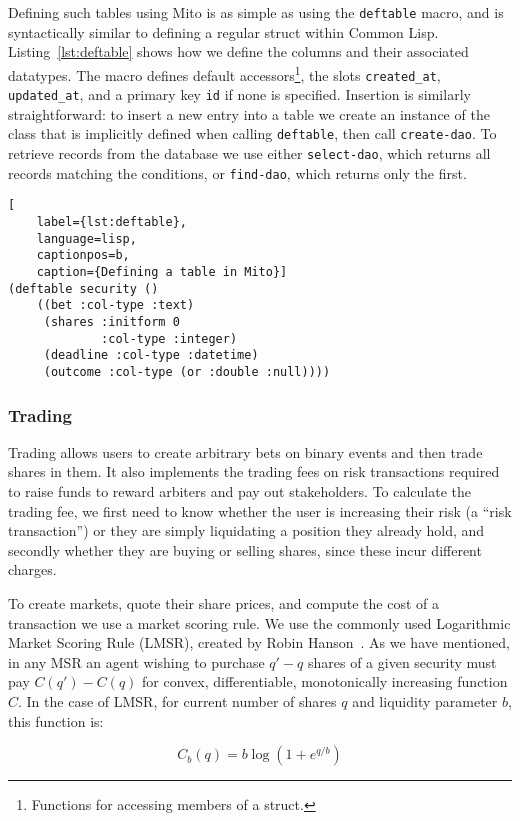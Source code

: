 \documentclass[10pt,a4paper]{article}
\theoremstyle{plain}
\theoremstyle{definition}
\newcommand{\code}[1]{\texttt{#1}}
\begin{document}
Defining such tables using Mito is as simple as using the \code{deftable}
macro, and is syntactically similar to defining a regular struct within Common
Lisp. Listing~\ref{lst:deftable} shows how we define the columns and their
associated datatypes. The macro defines default accessors\footnote{Functions
for accessing members of a struct.}, the slots \code{created\_at},
\code{updated\_at}, and a primary key \code{id} if none is specified. Insertion
is similarly straightforward: to insert a new entry into a table we create an
instance of the class that is implicitly defined when calling \code{deftable},
then call \code{create-dao}. To retrieve records from the database we use
either \code{select-dao}, which returns all records matching the conditions, or
\code{find-dao}, which returns only the first.

\begin{lstlisting}[
	label={lst:deftable},
	language=lisp,
	captionpos=b,
	caption={Defining a table in Mito}]
(deftable security ()
    ((bet :col-type :text)
     (shares :initform 0
             :col-type :integer)
     (deadline :col-type :datetime)
     (outcome :col-type (or :double :null))))
\end{lstlisting}

\subsubsection{Trading}

Trading allows users to create arbitrary bets on binary events and then trade
shares in them. It also implements the trading fees on risk transactions
required to raise funds to reward arbiters and pay out stakeholders. To
calculate the trading fee, we first need to know whether the user is increasing
their risk (a ``risk transaction'') or they are simply liquidating a position
they already hold, and secondly whether they are buying or selling shares,
since these incur different charges.

To create markets, quote their share prices, and compute the cost of a
transaction we use a market scoring rule. We use the commonly used Logarithmic
Market Scoring Rule (LMSR), created by Robin Hanson~\cite{LMSR}. As we have
mentioned, in any MSR an agent wishing to purchase $q'-q$ shares of a given
security must pay $C(q')-C(q)$ for convex, differentiable, monotonically
increasing function $C$. In the case of LMSR, for current number of shares $q$
and liquidity parameter $b$, this function is:

\begin{equation}
	\label{eq:LMSR}
	C_b(q) = b \log (1 + e^{q/b})
\end{equation}
\end{document}
